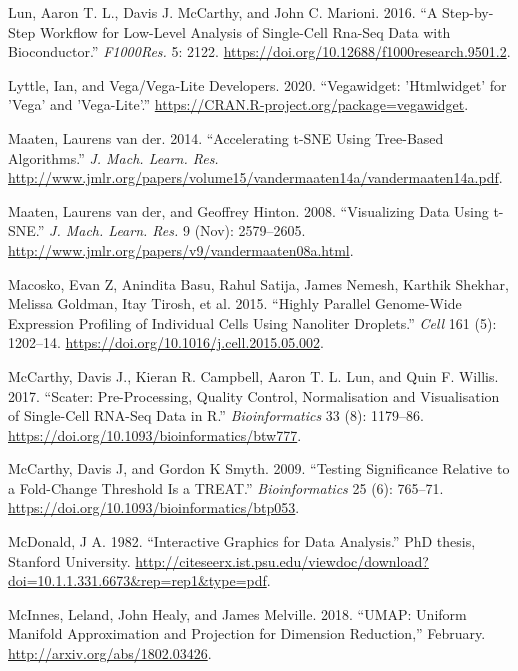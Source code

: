 \documentclass[article,notitle]{jdssv}
\begin{document}
\leavevmode\hypertarget{ref-Lun2016}{}%
Lun, Aaron T. L., Davis J. McCarthy, and John C. Marioni. 2016. ``A Step-by-Step Workflow for Low-Level Analysis of Single-Cell Rna-Seq Data with Bioconductor.'' \emph{F1000Res.} 5: 2122. \url{https://doi.org/10.12688/f1000research.9501.2}.

\leavevmode\hypertarget{ref-Lyttle2020-hp}{}%
Lyttle, Ian, and Vega/Vega-Lite Developers. 2020. ``Vegawidget: 'Htmlwidget' for 'Vega' and 'Vega-Lite'.'' \url{https://CRAN.R-project.org/package=vegawidget}.

\leavevmode\hypertarget{ref-Van_Der_Maaten2014-zn}{}%
Maaten, Laurens van der. 2014. ``Accelerating t-SNE Using Tree-Based Algorithms.'' \emph{J. Mach. Learn. Res.} \url{http://www.jmlr.org/papers/volume15/vandermaaten14a/vandermaaten14a.pdf}.

\leavevmode\hypertarget{ref-Maaten2008-sk}{}%
Maaten, Laurens van der, and Geoffrey Hinton. 2008. ``Visualizing Data Using t-SNE.'' \emph{J. Mach. Learn. Res.} 9 (Nov): 2579--2605. \url{http://www.jmlr.org/papers/v9/vandermaaten08a.html}.

\leavevmode\hypertarget{ref-Macosko2015-ot}{}%
Macosko, Evan Z, Anindita Basu, Rahul Satija, James Nemesh, Karthik Shekhar, Melissa Goldman, Itay Tirosh, et al. 2015. ``Highly Parallel Genome-Wide Expression Profiling of Individual Cells Using Nanoliter Droplets.'' \emph{Cell} 161 (5): 1202--14. \url{https://doi.org/10.1016/j.cell.2015.05.002}.

\leavevmode\hypertarget{ref-McCarthy2017}{}%
McCarthy, Davis J., Kieran R. Campbell, Aaron T. L. Lun, and Quin F. Willis. 2017. ``Scater: Pre-Processing, Quality Control, Normalisation and Visualisation of Single-Cell RNA-Seq Data in R.'' \emph{Bioinformatics} 33 (8): 1179--86. \url{https://doi.org/10.1093/bioinformatics/btw777}.

\leavevmode\hypertarget{ref-McCarthy2009-qx}{}%
McCarthy, Davis J, and Gordon K Smyth. 2009. ``Testing Significance Relative to a Fold-Change Threshold Is a TREAT.'' \emph{Bioinformatics} 25 (6): 765--71. \url{https://doi.org/10.1093/bioinformatics/btp053}.

\leavevmode\hypertarget{ref-McDonald1982-ew}{}%
McDonald, J A. 1982. ``Interactive Graphics for Data Analysis.'' PhD thesis, Stanford University. \url{http://citeseerx.ist.psu.edu/viewdoc/download?doi=10.1.1.331.6673\&rep=rep1\&type=pdf}.

\leavevmode\hypertarget{ref-McInnes2018-co}{}%
McInnes, Leland, John Healy, and James Melville. 2018. ``UMAP: Uniform Manifold Approximation and Projection for Dimension Reduction,'' February. \url{http://arxiv.org/abs/1802.03426}.
\end{document}
